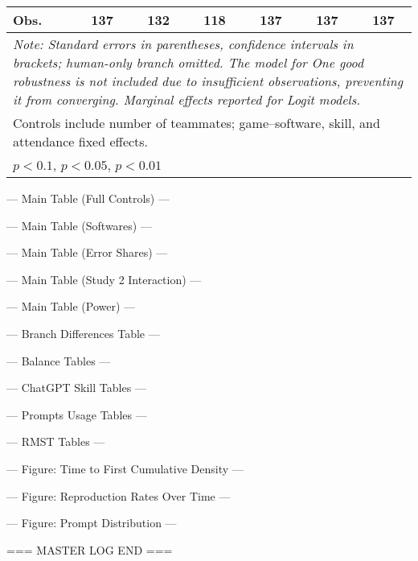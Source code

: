 \begin{tabular}{l*{6}{c}}
Obs.                &137   &132   &118   &137   &137   &137   \\
\hline
\hline\hline
\multicolumn{7}{p{0.8\textwidth}}{\it{Note:} Standard errors in parentheses, confidence intervals in brackets; human-only branch omitted. The model for One good robustness is not included due to insufficient observations, preventing it from converging. Marginal effects reported for Logit models.}\\
\multicolumn{7}{l}{Controls include number of teammates; game--software, skill, and attendance fixed effects.}\\
\multicolumn{7}{l}{\sym{*} \(p<0.1\), \sym{**} \(p<0.05\), \sym{***} \(p<0.01\)}\\
\end{tabular}

--- Main Table (Full Controls) ---

--- Main Table (Softwares) ---

--- Main Table (Error Shares) ---

--- Main Table (Study 2 Interaction) ---

--- Main Table (Power) ---

--- Branch Differences Table ---

--- Balance Tables ---

--- ChatGPT Skill Tables ---

--- Prompts Usage Tables ---

--- RMST Tables ---

--- Figure: Time to First Cumulative Density ---

--- Figure: Reproduction Rates Over Time ---

--- Figure: Prompt Distribution ---

=== MASTER LOG END ===
